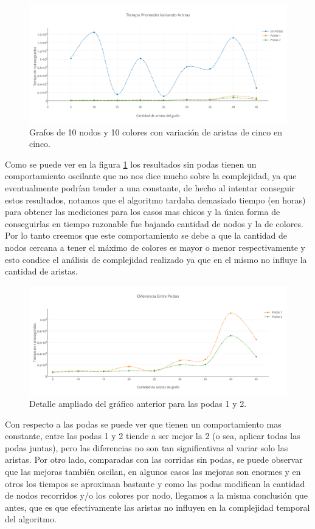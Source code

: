 \begin{figure}[H]
	\centering
 	\includegraphics[scale=0.45]{imagenes/Ej2/Aristas.png}
	\caption{Grafos de 10 nodos y 10 colores con variación de aristas de cinco en cinco.}
	\label{aristas}
 \end{figure}

 Como se puede ver en la figura \ref{aristas} los resultados sin podas tienen un comportamiento oscilante que no nos dice mucho sobre la complejidad, ya que eventualmente podrían tender a una constante, de hecho al intentar conseguir estos resultados, notamos que el algoritmo tardaba demasiado tiempo (en horas) para obtener las mediciones para los casos mas chicos y la única forma de conseguirlas en tiempo razonable fue bajando cantidad de nodos y la de colores. Por lo tanto creemos que este comportamiento se debe a que la cantidad de nodos cercana a tener el máximo de colores es mayor o menor respectivamente y esto condice el análisis de complejidad realizado ya que en el mismo no influye la cantidad de aristas.

\begin{figure}[H]
	\centering
 	\includegraphics[scale=0.45]{imagenes/Ej2/AristasPodas.png}
	\caption{Detalle ampliado del gráfico anterior para las podas 1 y 2.}
	\label{aristasP}
 \end{figure}

 Con respecto a las podas se puede ver que tienen un comportamiento mas constante, entre las podas 1 y 2 tiende a ser mejor la 2 (o sea, aplicar todas las podas juntas), pero las diferencias no son tan significativas al variar solo las aristas. Por otro lado, comparadas con las corridas sin podas, se puede observar que las mejoras también oscilan, en algunos casos las mejoras son enormes y en otros los tiempos se aproximan bastante y como las podas modifican la cantidad de nodos recorridos y/o los colores por nodo, llegamos a la misma conclusión que antes, que es que efectivamente las aristas no influyen en la complejidad temporal del algoritmo.\\

